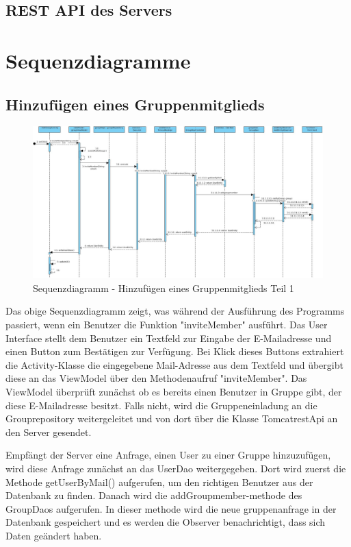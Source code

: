 \subsection{REST API des Servers}

\section{Sequenzdiagramme}

\subsection{Hinzufügen eines Gruppenmitglieds}

\begin{figure}[H]
	\centering
	\includegraphics[width=1\textwidth]{../Sequenzdiagramme/addGroupMember.jpg}
	\caption{Sequenzdiagramm - Hinzufügen eines Gruppenmitglieds Teil 1}
\end{figure}

Das obige Sequenzdiagramm zeigt, was während der Ausführung des Programms passiert, wenn ein Benutzer die Funktion "inviteMember" ausführt. Das User Interface stellt dem Benutzer ein Textfeld zur Eingabe der E-Mailadresse und einen Button zum Bestätigen zur Verfügung. Bei Klick dieses Buttons extrahiert die Activity-Klasse die eingegebene Mail-Adresse aus dem Textfeld und übergibt diese an das ViewModel über den Methodenaufruf "inviteMember". Das ViewModel überprüft zunächst ob es bereits einen Benutzer in Gruppe gibt, der diese E-Mailadresse besitzt. Falls nicht, wird die Gruppeneinladung an die Grouprepository weitergeleitet und von dort über die Klasse TomcatrestApi an den Server gesendet.

Empfängt der Server eine Anfrage, einen User zu einer Gruppe hinzuzufügen, wird diese Anfrage zunächst an das UserDao weitergegeben. Dort wird zuerst die Methode getUserByMail() aufgerufen, um den richtigen Benutzer aus der Datenbank zu finden. Danach wird die addGroupmember-methode des GroupDaos aufgerufen. In dieser methode wird die neue gruppenanfrage in der Datenbank gespeichert und es werden die Observer benachrichtigt, dass sich Daten geändert haben.

